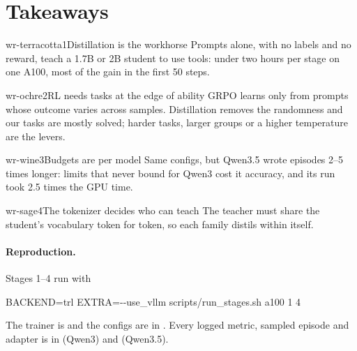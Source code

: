 \documentclass[11pt,a4paper]{article}
\begin{document}
\section{Takeaways}

\begin{tcbraster}[raster columns=2, raster equal height,
    raster column skip=4mm, raster row skip=4mm]
\begin{card}{wr-terracotta}{1\enspace Distillation is the workhorse}
Prompts alone, with no labels and no reward, teach a 1.7B or 2B student to
use tools: under two hours per stage on one A100, most of the gain in the
first 50 steps.
\end{card}
\begin{card}{wr-ochre}{2\enspace RL needs tasks at the edge of ability}
GRPO learns only from prompts whose outcome varies across samples.
Distillation removes the randomness and our tasks are mostly solved; harder
tasks, larger groups or a higher temperature are the levers.
\end{card}
\begin{card}{wr-wine}{3\enspace Budgets are per model}
Same configs, but Qwen3.5 wrote episodes 2--5 times longer: limits that
never bound for Qwen3 cost it accuracy, and its run took 2.5 times the GPU
time.
\end{card}
\begin{card}{wr-sage}{4\enspace The tokenizer decides who can teach}
The teacher must share the student's vocabulary token for token, so each
family distils within itself.
\end{card}
\end{tcbraster}

\paragraph{Reproduction.}
Stages 1--4 run with
\begin{codebox}
BACKEND=trl EXTRA=-{}-use\_vllm scripts/run\_stages.sh a100 1 4
\end{codebox}
\noindent The trainer is  and the configs are in
. Every logged metric, sampled episode and adapter is in
 (Qwen3) and 
(Qwen3.5).
\end{document}
